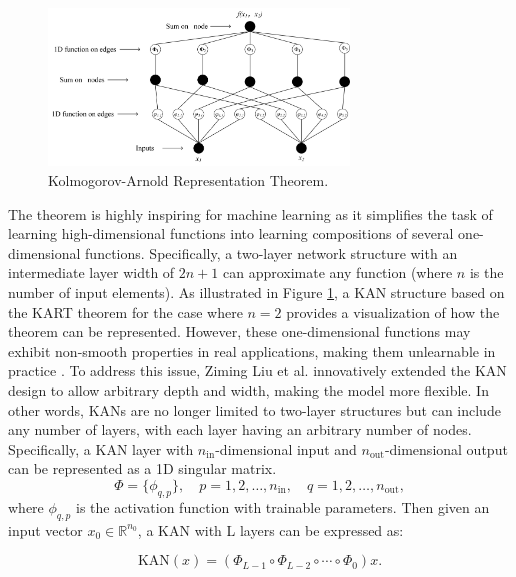 \documentclass{article}
\begin{document}
\begin{figure}[ht]
\centering
\includegraphics[width=8cm]{images/1.jpg}
\caption{Kolmogorov-Arnold Representation Theorem.}
\label{fig:KART}
\end{figure}

The theorem is highly inspiring for machine learning as it simplifies the task of learning high-dimensional functions into learning compositions of several one-dimensional functions. Specifically, a two-layer network structure with an intermediate layer width of $2n+1$ can approximate any function (where $n$ is the number of input elements). As illustrated in Figure \ref{fig:KART}, a KAN structure based on the KART theorem for the case where $n=2$ provides a visualization of how the theorem can be represented. However, these one-dimensional functions may exhibit non-smooth properties in real applications, making them unlearnable in practice \parencite{poggio2020theoretical}. To address this issue, Ziming Liu et al. \parencite{liu2024kankolmogorovarnoldnetworks} innovatively extended the KAN design to allow arbitrary depth and width, making the model more flexible. In other words, KANs are no longer limited to two-layer structures but can include any number of layers, with each layer having an arbitrary number of nodes. Specifically, a KAN layer with $n_{\text{in}}$-dimensional input and $n_{\text{out}}$-dimensional output can be represented as a 1D singular matrix.
\begin{equation}
\Phi = \{\phi_{q,p}\}, \quad p = 1, 2, \dots, n_{\text{in}}, \quad q = 1, 2, \dots, n_{\text{out}},
\end{equation}
where \(\phi_{q,p}\) is the activation function with trainable parameters.
Then given an input vector \(x_0 \in \mathbb{R}^{n_0}\), a KAN with L layers can be expressed as:

\begin{equation}
\text{KAN}(x) = (\Phi_{L-1} \circ \Phi_{L-2} \circ \cdots \circ \Phi_0)x.
\end{equation}
\end{document}
